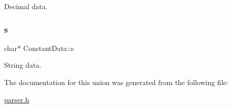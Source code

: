 Decimal data. \mbox{\label{union_constant_data_aee1ab22b8dd076717f5de146f8939b46}} 
\subsubsection{\texorpdfstring{s}{s}}
{\footnotesize\ttfamily char$\ast$ Constant\+Data\+::s}

String data. 

The documentation for this union was generated from the following file\+:\begin{DoxyCompactItemize}
\item 
\hyperlink{parser_8h}{parser.\+h}\end{DoxyCompactItemize}

